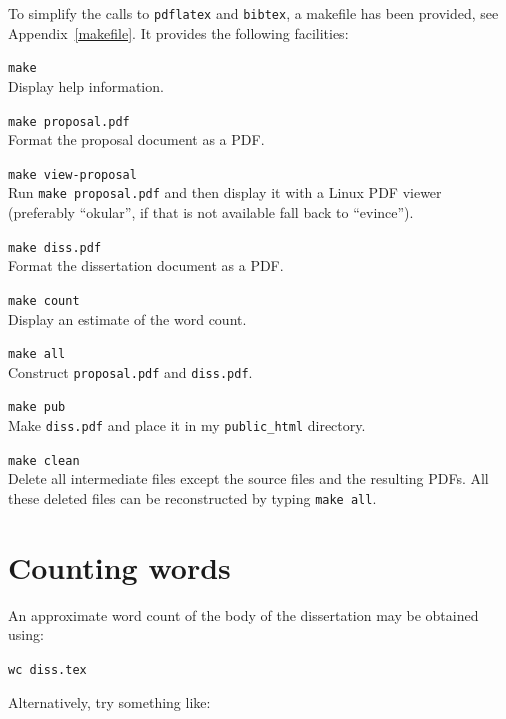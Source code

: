 \documentclass[12pt,a4paper,twoside,openright]{report}
\begin{document}
To simplify the calls to \texttt{pdflatex} and \texttt{bibtex}, 
a makefile has been provided, see Appendix~\ref{makefile}. 
It provides the following facilities:

\begin{description}

\item\texttt{make} \\
 Display help information.

\item\texttt{make proposal.pdf} \\
 Format the proposal document as a PDF.

\item\texttt{make view-proposal} \\
 Run \texttt{make proposal.pdf} and then display it with a Linux PDF viewer
 (preferably ``okular'', if that is not available fall back to ``evince'').

\item\texttt{make diss.pdf} \\
 Format the dissertation document as a PDF.

\item\texttt{make count} \\
Display an estimate of the word count.

\item\texttt{make all} \\
Construct \texttt{proposal.pdf} and \texttt{diss.pdf}.

\item\texttt{make pub} \\ Make \texttt{diss.pdf}
and place it in my \texttt{public\_html} directory.

\item\texttt{make clean} \\ Delete all intermediate files except the
source files and the resulting PDFs. All these deleted files can
be reconstructed by typing \texttt{make all}.

\end{description}


\section{Counting words}

An approximate word count of the body of the dissertation may be
obtained using:

\texttt{wc diss.tex}

\noindent
Alternatively, try something like:
\end{document}

